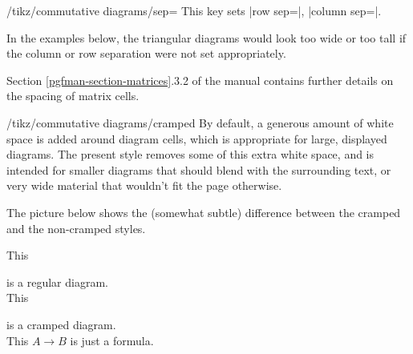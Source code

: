 \documentclass[a4paper]{ltxdoc}
\begin{document}
\begin{key}{/tikz/commutative diagrams/sep=}
  This key sets |row sep=|, |column sep=|.
\end{key}

In the examples below, the triangular diagrams would look too wide or
too tall if the column or row separation were not set appropriately.

\begin{codeexample}[]
\end{codeexample}

\begin{codeexample}[]
\end{codeexample}

Section \ref*{pgfman-section-matrices}.3.2 of the \pgfname{} manual
\cite{pgfman} contains further details on the spacing of matrix cells.

\begin{stylekey}{/tikz/commutative diagrams/cramped}
  By default, a generous amount of white space is added around diagram
  cells, which is appropriate for large, displayed diagrams.  The
  present style removes some of this extra white space, and is
  intended for smaller diagrams that should blend with the surrounding
  text, or very wide material that wouldn't fit the page otherwise.
\end{stylekey}

The picture below shows the (somewhat subtle) difference
between the cramped and the non-cramped styles.

\begin{codeexample}[pre=\minipage{6cm},post=\endminipage]
This  is a regular diagram.\\
This  is a cramped diagram.\\
This $A \to B$ is just a formula.
\end{codeexample}
\end{document}
